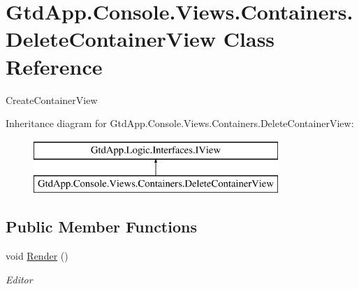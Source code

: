 \hypertarget{class_gtd_app_1_1_console_1_1_views_1_1_containers_1_1_delete_container_view}{}\section{Gtd\+App.\+Console.\+Views.\+Containers.\+Delete\+Container\+View Class Reference}
\label{class_gtd_app_1_1_console_1_1_views_1_1_containers_1_1_delete_container_view}


Create\+Container\+View  


Inheritance diagram for Gtd\+App.\+Console.\+Views.\+Containers.\+Delete\+Container\+View\+:\begin{figure}[H]
\begin{center}
\leavevmode
\includegraphics[height=2.000000cm]{class_gtd_app_1_1_console_1_1_views_1_1_containers_1_1_delete_container_view}
\end{center}
\end{figure}
\subsection*{Public Member Functions}
\begin{DoxyCompactItemize}
\item 
void \mbox{\hyperlink{class_gtd_app_1_1_console_1_1_views_1_1_containers_1_1_delete_container_view_a794e418996670c0ec9a44c21c71e1c09}{Render}} ()
\begin{DoxyCompactList}\small\item\em Editor \end{DoxyCompactList}\end{DoxyCompactItemize}
